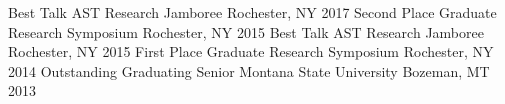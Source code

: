 \begin{cvhonors}
  \cvhonor
    {Best Talk}
    {AST Research Jamboree}
    {Rochester, NY}
    {2017}  
  \cvhonor
    {Second Place}
    {Graduate Research Symposium}
    {Rochester, NY}
    {2015}  
  \cvhonor
    {Best Talk}
    {AST Research Jamboree}
    {Rochester, NY}
    {2015}  
  \cvhonor
    {First Place}
    {Graduate Research Symposium}
    {Rochester, NY}
    {2014}
  \cvhonor
    {Outstanding Graduating Senior}
    {Montana State University}
    {Bozeman, MT}
    {2013}
\end{cvhonors}